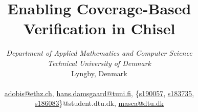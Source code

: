 \documentclass[conference]{IEEEtran}
\newcommand{\martin}[1]{{\color{blue} Martin: #1}}
\begin{document}
%
\title{Enabling Coverage-Based Verification in Chisel}
%

\author{
\IEEEauthorblockA\textit{Department of Applied Mathematics and Computer Science} \\
\textit{Technical University of Denmark}\\
Lyngby, Denmark \\\\
\href{mailto:adobis@ethz.ch}{adobis@ethz.ch}, \href{mailto:hans.damsgaard@tuni.fi}{hans.damsgaard@tuni.fi}, \{\href{mailto:s190057@student.dtu.dk}{s190057}, \href{mailto:s183735@student.dtu.dk}{s183735}, \href{mailto:s186083@student.dtu.dk}{s186083}\}@student.dtu.dk, \href{mailto:masca@dtu.dk}{masca@dtu.dk}
}


%
%
\maketitle              %
%
\end{document}
